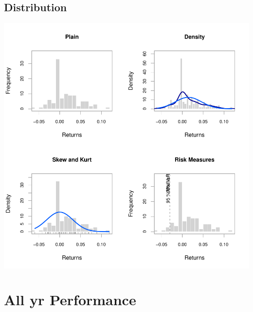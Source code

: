 \documentclass{article}
\begin{document}
\subsection{Distribution}

\includegraphics{graphics/plot-003}

\section{All yr Performance}
\end{document}
